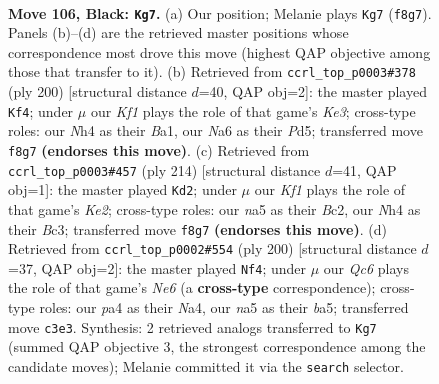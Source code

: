 \documentclass[11pt]{article}
\begin{document}
\clearpage

\begin{figure}[p]\centering
\begin{subfigure}{0.46\textwidth}\centering
\resizebox{\linewidth}{!}{%
\newchessgame
\chessboard[
  setfen={5k2/8/n7/N7/Pp2P2n/2q5/B4b1p/3K4 b - - 5 106},
  showmover=false,
  pgfstyle=straightmove, color=movearrow, markmove={f8-g7}
]}
\caption{}
\end{subfigure}\hfill
\begin{subfigure}{0.46\textwidth}\centering
\resizebox{\linewidth}{!}{%
\newchessgame
\chessboard[
  setfen={8/3b4/4PQ2/2PP3k/8/4K3/p7/B7 w - - 5 101},
  showmover=false,
  pgfstyle=straightmove, color=movearrow, markmove={e3-f4}
]}
\caption{}
\end{subfigure}
\\[4pt]
\begin{subfigure}{0.46\textwidth}\centering
\resizebox{\linewidth}{!}{%
\newchessgame
\chessboard[
  setfen={8/3k4/1b3p2/3bnN2/P7/2B5/2B1K3/8 w - - 9 108},
  showmover=false,
  pgfstyle=straightmove, color=movearrow, markmove={e2-d2}
]}
\caption{}
\end{subfigure}\hfill
\begin{subfigure}{0.46\textwidth}\centering
\resizebox{\linewidth}{!}{%
\newchessgame
\chessboard[
  setfen={b3k3/8/4N1p1/b5P1/N7/4P3/5K2/8 w - - 7 101},
  showmover=false,
  pgfstyle=straightmove, color=movearrow, markmove={e6-f4}
]}
\caption{}
\end{subfigure}
\caption{\textbf{Move 106, Black: \texttt{Kg7}.} (a) Our position; Melanie plays \texttt{Kg7} (\texttt{f8g7}). Panels (b)--(d) are the retrieved master positions whose correspondence most drove this move (highest QAP objective among those that transfer to it). (b) Retrieved from \texttt{ccrl\_top\_p0003\#378} (ply 200) [structural distance $d$=40, QAP obj=2]: the master played \texttt{Kf4}; under $\mu$ our \emph{Kf1} plays the role of that game's \emph{Ke3}; cross-type roles: our \emph{N}h4 as their \emph{B}a1, our \emph{N}a6 as their \emph{P}d5; transferred move \texttt{f8g7} \textbf{(endorses this move)}. (c) Retrieved from \texttt{ccrl\_top\_p0003\#457} (ply 214) [structural distance $d$=41, QAP obj=1]: the master played \texttt{Kd2}; under $\mu$ our \emph{Kf1} plays the role of that game's \emph{Ke2}; cross-type roles: our \emph{n}a5 as their \emph{B}c2, our \emph{N}h4 as their \emph{B}c3; transferred move \texttt{f8g7} \textbf{(endorses this move)}. (d) Retrieved from \texttt{ccrl\_top\_p0002\#554} (ply 200) [structural distance $d$=37, QAP obj=2]: the master played \texttt{Nf4}; under $\mu$ our \emph{Qc6} plays the role of that game's \emph{Ne6} (a \textbf{cross-type} correspondence); cross-type roles: our \emph{p}a4 as their \emph{N}a4, our \emph{n}a5 as their \emph{b}a5; transferred move \texttt{c3e3}. Synthesis: 2 retrieved analogs transferred to \texttt{Kg7} (summed QAP objective 3, the strongest correspondence among the candidate moves); Melanie committed it via the \texttt{search} selector.}
\label{fig:thought-m211}
\end{figure}
\end{document}
